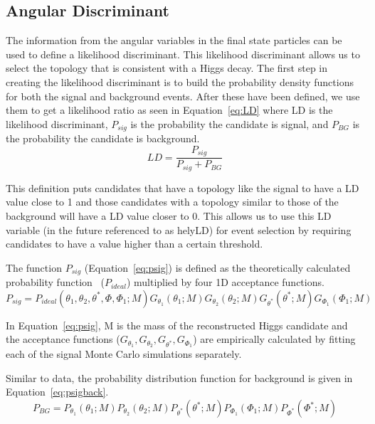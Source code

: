 \subsection{Angular Discriminant}

The information from the angular variables in the final state particles can be used to define a likelihood discriminant.  This likelihood discriminant allows us to select the topology that is consistent with a Higgs decay.  The first step in creating the likelihood discriminant is to build the probability density functions  for both the signal and background events.  After these have been defined, we use them to get a likelihood ratio as seen in Equation~\ref{eq:LD} where LD is the likelihood discriminant, $P_{sig}$ is the probability the candidate is signal, and $P_{BG}$ is the probability the candidate is background.
  \begin{equation} LD = \dfrac{P_{sig}}{P_{sig}+P_{BG}} \label{eq:LD}\end{equation}

This definition puts candidates that have a topology like the signal to have a LD value close to 1 and those candidates with a topology similar to those of the background will have a LD value closer to 0.  This allows us to use this LD variable (in the future referenced to as helyLD) for event selection by requiring candidates to have a value higher than a certain threshold.

The function $P_{sig}$ (Equation~\ref{eq:psig}) is defined as the theoretically calculated probability function~\cite{PhysRevD.81.075022} ($P_{ideal}$) multiplied by four 1D acceptance functions.  
\begin{equation} P_{sig} = P_{ideal}(\theta_1, \theta_2, \theta^*, \Phi, \Phi_1 ;M)G_{\theta_1}(\theta_1;M)G_{\theta_2}(\theta_2;M)G_{\theta^*}(\theta^*;M)G_{\Phi_1}(\Phi_1;M) \label{eq:psig}\end{equation}

In Equation~\ref{eq:psig}, M is the mass of the reconstructed Higgs candidate and the acceptance functions ($G_{\theta_1},G_{\theta_2},G_{\theta^*},G_{\Phi_1}$) are empirically calculated by fitting each of the signal Monte Carlo simulations separately.

Similar to data, the probability distribution function for background is given in Equation~\ref{eq:psigback}.
\begin{equation} P_{BG} = P_{\theta_1}(\theta_1;M)P_{\theta_2}(\theta_2;M)P_{\theta^*}(\theta^*;M)P_{\Phi_1}(\Phi_1;M)P_{\Phi^*}(\Phi^*;M) \label{eq:psigback}\end{equation}

